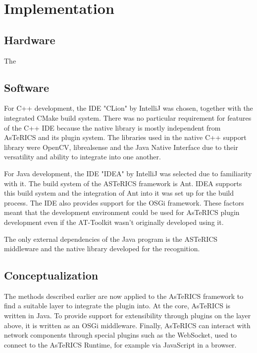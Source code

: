 \documentclass[BSA,Bachelor,english]{twbook}%
\begin{document}
\chapter{Implementation}

\section{Hardware}

The 

\section{Software}
For C++ development, the IDE "CLion" by IntelliJ was chosen, together with the integrated CMake build system. There was no particular requirement for features of the C++ IDE because the native library is mostly independent from AsTeRICS and its plugin system. The libraries used in the native C++ support library were OpenCV, librealsense and the Java Native Interface due to their versatility and ability to integrate into one another.

For Java development, the IDE "IDEA" by IntelliJ was selected due to familiarity with it. The build system of the ASTeRICS framework is Ant. IDEA supports this build system and the integration of Ant into it was set up for the build process. The IDE also provides support for the OSGi framework. These factors meant that the development environment could be used for AsTeRICS plugin development even if the AT-Toolkit wasn't originally developed using it. 

The only external dependencies of the Java program is the ASTeRICS middleware and the native library developed for the recognition.

\section{Conceptualization}

The methods described earlier are now applied to the AsTeRICS framework to find a suitable layer to integrate the plugin into. At the core, AsTeRICS is written in Java. To provide support for extensibility through plugins on the layer above, it is written as an OSGi middleware. Finally, AsTeRICS can interact with network components through special plugins such as the WebSocket, used to connect to the AsTeRICS Runtime, for example via JavaScript in a browser.
\end{document}

